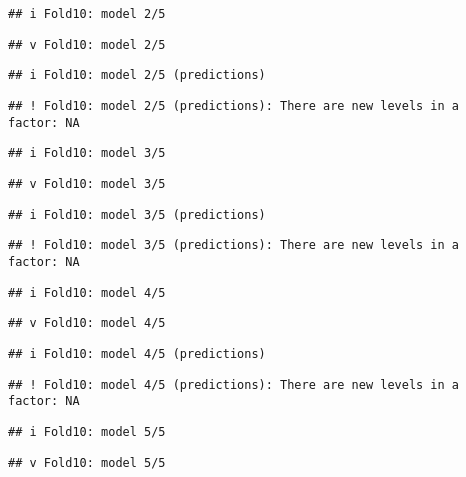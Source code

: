 \documentclass[
]{article}
\begin{document}
\begin{verbatim}
## i Fold10: model 2/5
\end{verbatim}

\begin{verbatim}
## v Fold10: model 2/5
\end{verbatim}

\begin{verbatim}
## i Fold10: model 2/5 (predictions)
\end{verbatim}

\begin{verbatim}
## ! Fold10: model 2/5 (predictions): There are new levels in a factor: NA
\end{verbatim}

\begin{verbatim}
## i Fold10: model 3/5
\end{verbatim}

\begin{verbatim}
## v Fold10: model 3/5
\end{verbatim}

\begin{verbatim}
## i Fold10: model 3/5 (predictions)
\end{verbatim}

\begin{verbatim}
## ! Fold10: model 3/5 (predictions): There are new levels in a factor: NA
\end{verbatim}

\begin{verbatim}
## i Fold10: model 4/5
\end{verbatim}

\begin{verbatim}
## v Fold10: model 4/5
\end{verbatim}

\begin{verbatim}
## i Fold10: model 4/5 (predictions)
\end{verbatim}

\begin{verbatim}
## ! Fold10: model 4/5 (predictions): There are new levels in a factor: NA
\end{verbatim}

\begin{verbatim}
## i Fold10: model 5/5
\end{verbatim}

\begin{verbatim}
## v Fold10: model 5/5
\end{verbatim}
\end{document}
